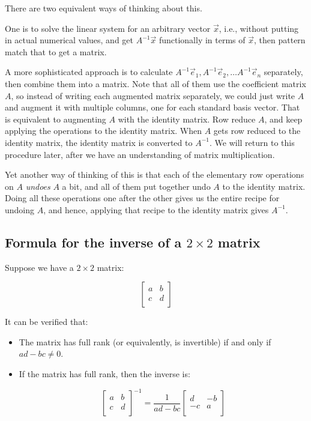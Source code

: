 \documentclass[10pt]{amsart}
\begin{document}
There are two equivalent ways of thinking about this.

One is to solve the linear system for an arbitrary vector $\vec{x}$,
i.e., without putting in actual numerical values, and get
$A^{-1}\vec{x}$ functionally in terms of $\vec{x}$, then pattern match
that to get a matrix.

A more sophisticated approach is to calculate $A^{-1}\vec{e}_1,
A^{-1}\vec{e}_2, \dots A^{-1}\vec{e}_n$ separately, then combine them
into a matrix. Note that all of them use the coefficient matrix $A$,
so instead of writing each augmented matrix separately, we could just
write $A$ and augment it with multiple columns, one for each standard
basis vector. That is equivalent to augmenting $A$ with the identity
matrix. Row reduce $A$, and keep applying the operations to the
identity matrix. When $A$ gets row reduced to the identity matrix, the
identity matrix is converted to $A^{-1}$. We will return to this
procedure later, after we have an understanding of matrix
multiplication.

Yet another way of thinking of this is that each of the elementary row
operations on $A$ {\em undoes} $A$ a bit, and all of them put together
undo $A$ to the identity matrix. Doing all these operations one after
the other gives us the entire recipe for undoing $A$, and hence,
applying that recipe to the identity matrix gives $A^{-1}$.

\subsection{Formula for the inverse of a $2 \times 2$ matrix}

Suppose we have a $2 \times 2$ matrix:

$$\left[\begin{matrix} a & b \\ c & d \\\end{matrix}\right]$$

It can be verified that:

\begin{itemize}
\item The matrix has full rank (or equivalently, is invertible) if and
  only if $ad - bc \ne 0$.
\item If the matrix has full rank, then the inverse is:

  $$\left[\begin{matrix} a & b \\ c & d \\\end{matrix}\right]^{-1} = \frac{1}{ad - bc} \left[\begin{matrix} d & -b \\ -c & a \\\end{matrix}\right]$$
\end{itemize}
\end{document}
